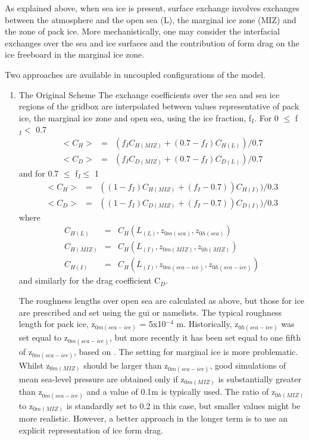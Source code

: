 \documentclass{UMDP_article}
\begin{document}
As explained above, when sea ice is present, surface exchange involves
exchanges between the atmosphere and the open sea (L), the marginal 
ice zone (MIZ) and the zone of pack ice. More mechanistically, one may
consider the interfacial exchanges over the sea and ice surfaces and the 
contribution of form drag on the ice freeboard in the marginal ice zone.

Two approaches are available in uncoupled configurations of the model.

\begin{enumerate}

\item
{The Original Scheme}
The exchange coefficients over the sea and sea ice regions of the
gridbox are interpolated between values representative of pack ice, 
the marginal ice zone and open sea, using the ice 
fraction, f$_{I}$. For 0 $\le $ f$_{I} <$ 0.7
\begin{eqnarray}
  < C_H >&=&(  f_I  C_{H(MIZ)} + ( 0.7 -  f_I )  C_{H(L)} ) / 0.7
  \label{1.6.1} \\
  < C_D >&=&(  f_I  C_{D(MIZ)} + ( 0.7 -  f_I )  C_{D(L)} ) / 0.7
  \label{1.6.2}
\end{eqnarray}
and for 0.7 $\le $ f$_{I} \le $ 1
\begin{eqnarray}
  < C_H >&=&( ( 1 -  f_I )  C_{H(MIZ)} + (  f_I - 0.7 ) )  C_{H(I)} ) / 0.3
  \label{1.6.3} \\
  < C_D >&=&( ( 1 -  f_I )  C_{D(MIZ)} + (  f_I - 0.7 ) )  C_{D(I)} ) / 0.3
  \label{1.6.4}
\end{eqnarray}
where
\begin{eqnarray}
  C_{H(L)}&= &C_H (  L_{(L)} ,  z_{0m(sea)} ,  z_{0h(sea)} )
  \label{1.6.5} \\
  C_{H(MIZ)}&=& C_H (  L_{(I)} ,  z_{0m(MIZ)} ,  z_{0h(MIZ)} )
  \label{1.6.6} \\
  C_{H(I)}&=& C_H (  L_{(I)} ,  z_{0m(sea-ice)} ,  z_{0h(sea-ice)} )
  \label{1.6.7}
\end{eqnarray}
and similarly for the drag coefficient C$_{D}$.

The roughness lengths over open sea are calculated as above, but those for
ice are prescribed and set using the gui or namelists. The typical
roughness length for pack ice, z$_{0m(sea-ice)}$ = 5x10$^{-4}$ m. 
Historically, z$_{0h(sea-ice)}$ was set equal to z$_{0m(sea-ice)}$,
but more recently it has been set equal to one fifth of z$_{0m(sea-ice)}$,
based on \cite{andreas2010}. The setting for marginal ice is more
problematic. Whilst z$_{0m(MIZ)}$ should be larger than z$_{0m(sea-ice)}$,
good simulations of mean sea-level pressure are obtained only if
z$_{0m(MIZ)}$ is substantially greater than z$_{0m(sea-ice)}$ and a
value of 0.1m is typically used. The ratio of z$_{0h(MIZ)}$ to
z$_{0m(MIZ)}$ is standardly set to 0.2 in this case, but smaller values
might be more realistic. However, a better approach in the longer term
is to use an explicit representation of ice form drag.


\end{enumerate}
\end{document}

